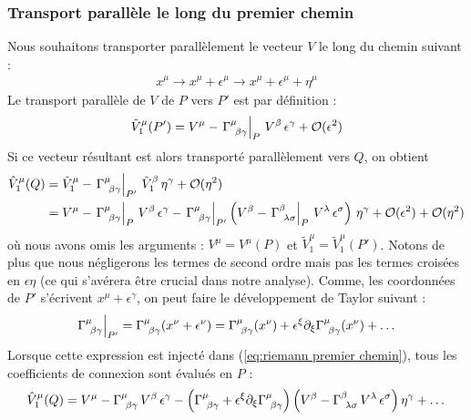 \subsubsection{Transport parallèle le long du premier chemin}
Nous souhaitons transporter parallèlement le vecteur $V$ le long du chemin suivant :
\begin{align}
        x^\mu \rightarrow x^\mu+\epsilon^\mu \rightarrow  x^\mu + \epsilon^\mu + \eta^\mu
\end{align}
Le transport parallèle de $V$ de $P$ vers $P'$ est par définition :
\begin{equation}
    \tilde{V}^\mu_1 (P') = V^\mu - \left. \Gamma\indices{^\mu_{\!\beta \gamma}}\right|_P \, V^\beta \, \epsilon^\gamma + \mathcal{O}(\epsilon^2)
\end{equation}
Si ce vecteur résultant est alors transporté parallèlement vers $Q$, on obtient 
\begin{align}
\label{eq:riemann premier chemin}
    \hat{V}^\mu_1 (Q) &= \tilde{V}^\mu_1 - \left. \Gamma\indices{^\mu_{\!\beta \gamma}} \right|_{P'} \, \tilde{V}^\beta_1 \,  \eta^\gamma + \mathcal{O}(\eta^2)\\
     \nonumber
    & = V^\mu - \left. \Gamma\indices{^\mu_{\!\beta \gamma}} \right|_P \, V^\beta \, \epsilon^\gamma - \left. \Gamma\indices{^\mu_{\!\beta \gamma}} \right|_{P'} \lt V^\beta -\left. \Gamma\indices{^\beta_{\!\lambda \sigma}}\right|_P \, V^\lambda \, \epsilon^\sigma \rt \, \eta^\gamma +  \mathcal{O}(\epsilon^2) + \mathcal{O}(\eta^2)
\end{align}
où nous avons omis les arguments : $V^\mu = V^\mu(P)$ et $\tilde{V}^\mu_1 = \tilde{V}^\mu_1 (P')$. Notons de plus que nous négligerons les termes de second ordre mais pas les termes croisées en $\epsilon \eta$ (ce qui s'avérera être crucial dans notre analyse). Comme, les coordonnées de $P'$ s'écrivent $x^\mu + \epsilon^\gamma$, on peut faire le développement de Taylor suivant :
\begin{equation}
    \label{eq:taylor connexion}
    \left. \Gamma\indices{^\mu_{\!\beta \gamma}} \right|_{P'} = \Gamma\indices{^\mu_{\!\beta \gamma}} (x^\nu +\epsilon^\nu ) = \Gamma\indices{^\mu_{\!\beta \gamma}} (x^\nu) + \epsilon^\xi \pd_\xi \Gamma\indices{^\mu_{\!\beta \gamma}} (x^\nu) + \dots
\end{equation}
Lorsque cette expression est injecté dans (\ref{eq:riemann premier chemin}), tous les coefficients de connexion sont évalués en $P$ :
\begin{equation}
    \label{eq: premier chemin}
    \hat{V}^\mu_1 (Q) = V^\mu - \Gamma\indices{^\mu_{\!\beta \gamma}}  \, V^\beta \, \epsilon^\gamma - \lt \Gamma\indices{^\mu_{\!\beta \gamma}} + \epsilon^\xi \pd_\xi \Gamma\indices{^\mu_{\!\beta \gamma}} \rt \lt V^\beta - \Gamma\indices{^\beta_{\!\lambda \sigma}} \, V^\lambda \, \epsilon^\sigma \rt \eta^\gamma +  \dots
\end{equation} 
